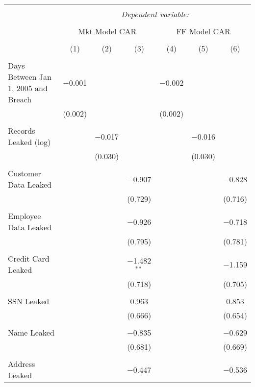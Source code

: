 
\begin{table}[!htbp] \centering 
  \caption{} 
  \label{} 
\begin{tabular}{@{\extracolsep{5pt}}lcccccc} 
\\[-1.8ex]\hline 
\hline \\[-1.8ex] 
 & \multicolumn{6}{c}{\textit{Dependent variable:}} \\ 
\cline{2-7} 
\\[-1.8ex] & \multicolumn{3}{c}{Mkt Model CAR} & \multicolumn{3}{c}{FF Model CAR} \\ 
\\[-1.8ex] & (1) & (2) & (3) & (4) & (5) & (6)\\ 
\hline \\[-1.8ex] 
 Days Between Jan 1, 2005 and Breach & $-$0.001 &  &  & $-$0.002 &  &  \\ 
  & (0.002) &  &  & (0.002) &  &  \\ 
  & & & & & & \\ 
 Records Leaked (log) &  & $-$0.017 &  &  & $-$0.016 &  \\ 
  &  & (0.030) &  &  & (0.030) &  \\ 
  & & & & & & \\ 
 Customer Data Leaked &  &  & $-$0.907 &  &  & $-$0.828 \\ 
  &  &  & (0.729) &  &  & (0.716) \\ 
  & & & & & & \\ 
 Employee Data Leaked &  &  & $-$0.926 &  &  & $-$0.718 \\ 
  &  &  & (0.795) &  &  & (0.781) \\ 
  & & & & & & \\ 
 Credit Card Leaked &  &  & $-$1.482$^{**}$ &  &  & $-$1.159 \\ 
  &  &  & (0.718) &  &  & (0.705) \\ 
  & & & & & & \\ 
 SSN Leaked &  &  & 0.963 &  &  & 0.853 \\ 
  &  &  & (0.666) &  &  & (0.654) \\ 
  & & & & & & \\ 
 Name Leaked &  &  & $-$0.835 &  &  & $-$0.629 \\ 
  &  &  & (0.681) &  &  & (0.669) \\ 
  & & & & & & \\ 
 Address Leaked &  &  & $-$0.447 &  &  & $-$0.536 \\ 

\end{tabular}
\end{table}
